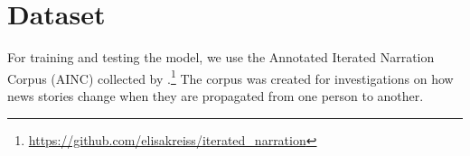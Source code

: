 \documentclass[11pt,a4paper]{article}
\begin{document}




\section{Dataset}
For training and testing the model, we use the Annotated Iterated Narration Corpus (AINC) collected by \citet{Kreiss:2019}.\footnote{\url{https://github.com/elisakreiss/iterated_narration}} The corpus was created for investigations on how news stories change when they are propagated from one person to another.
\end{document}
